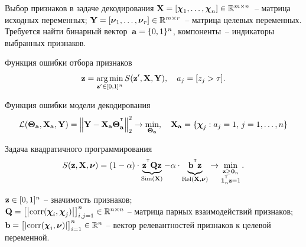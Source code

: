 \documentclass[10pt]{beamer}
\begin{document}
\begin{frame}{Выбор признаков в задаче декодирования}
	$\mathbf{X} = [\boldsymbol{\chi}_1, \dots, \boldsymbol{\chi}_n] \in \mathbb{R}^{m \times n}$~-- матрица исходных переменных; $\mathbf{Y} = [\boldsymbol{\nu}_1, \dots, \boldsymbol{\nu}_r] \in \mathbb{R}^{m \times r}$~-- матрица целевых переменных. \\
	Требуется найти бинарный вектор~$\mathbf{a} = \{0, 1\}^n$, компоненты~-- индикаторы выбранных признаков. 
	\begin{block}{Функция ошибки отбора признаков}
		\vspace{-0.3cm}
		\[
			\mathbf{z} = \mathop{\arg \min}\limits_{\mathbf{z}' \in [0, 1]^n} S(\mathbf{z}', \mathbf{X}, \mathbf{Y}), \quad 
		a_j = [z_j > \tau].
		\]
		\vspace{-0.2cm}
	\end{block}
	\begin{block}{Функция ошибки модели декодирования}
		\vspace{-0.6cm}
		\[
			\mathcal{L}(\boldsymbol{\Theta}_{\mathbf{a}}, \mathbf{X}_{\mathbf{a}}, \mathbf{Y}) = {\left\| \mathbf{Y} - \mathbf{X}_{\mathbf{a}}\boldsymbol{\Theta}^{^{\text{\tiny\sffamily\upshape\mdseries T}}}_{\mathbf{a}} \right\| }_2^2 \rightarrow\min_{\boldsymbol{\Theta}_{\mathbf{a}}}, \quad \mathbf{X}_{\mathbf{a}} = \{\boldsymbol{\chi}_j: a_j = 1, \, j = 1, \dots, n\}
		\]
		\vspace{-0.6cm}
	\end{block}
	\begin{block}{Задача квадратичного программирования}
	\vspace{-0.3cm}
	\[
	S(\mathbf{z}, \mathbf{X}, \boldsymbol{\nu}) = (1 - \alpha) \cdot \underbrace{\mathbf{z}^{^{\text{\tiny\sffamily\upshape\mdseries T}}} \mathbf{Q} \mathbf{z}}_{\text{Sim}(\mathbf{X})} - \alpha \cdot \underbrace{\vphantom{()} \mathbf{b}^{^{\text{\tiny\sffamily\upshape\mdseries T}}} \mathbf{z}}_{\text{Rel}(\mathbf{X}, \boldsymbol{\nu})} \rightarrow \min_{\substack{\mathbf{z} \geq \boldsymbol{0}_n \\ \boldsymbol{1}_n^{^{\text{\tiny\sffamily\upshape\mdseries T}}} \mathbf{z}=1}}.
	\]
	\vspace{-0.5cm}
	\end{block}
		$\mathbf{z} \in [0, 1]^n$ -- значимость признаков; \\
		$\mathbf{Q} = \bigl[\left|\text{corr}(\boldsymbol{\chi}_i, \boldsymbol{\chi}_j)\right|\bigr]_{i,j=1}^n \in \mathbb{R}^{n \times n}$ -- матрица парных взаимодействий признаков; \\
		$\mathbf{b} = \bigl[\left|\text{corr}(\boldsymbol{\chi}_i, \boldsymbol{\nu})\right|\bigr]_{i=1}^n \in \mathbb{R}^n$ -- вектор релевантностей признаков к целевой переменной. 
\end{frame}
\end{document}

